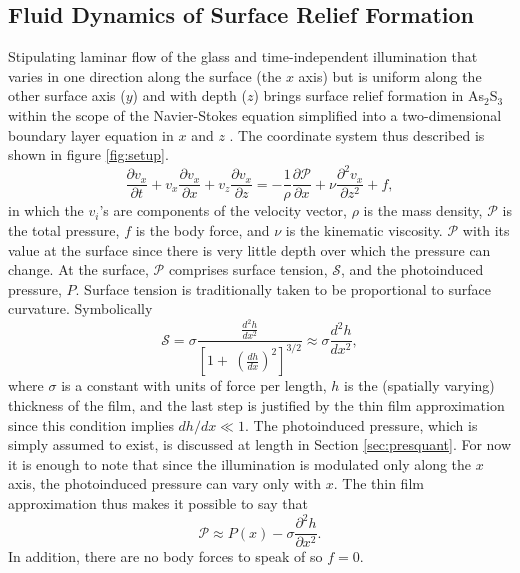 \documentclass[twocolumn,showpacs,preprintnumbers,amsmath,amssymb]{revtex4}
\begin{document}
\subsection{Fluid Dynamics of Surface Relief Formation}
\label{sec:fluids} Stipulating laminar flow of the glass and time-independent
illumination that varies in one direction along the surface (the $x$ axis) but is uniform
along the other surface axis ($y$) and with depth ($z$) brings surface relief formation
in As$_2$S$_3$ within the scope of the Navier-Stokes equation simplified into a
two-dimensional boundary layer equation in $x$ and $z$ \cite{levich}. The coordinate
system thus described is shown in figure \ref{fig:setup}.
\begin{equation}
\frac{\partial v_x}{\partial t}+v_x\frac{\partial v_x}{\partial x} +v_z\frac{\partial
v_x}{\partial z} = - \frac{1}{\rho}\frac{\partial \mathcal{P}}{\partial
x}+\nu\frac{\partial^2 v_x}{\partial z^2}+f \mathrm{,} \label{eq:levstokes}
\end{equation}
in which the $v_i$'s are components of the velocity vector, $\rho$ is the mass density,
$\mathcal{P}$ is the total pressure,  $f$ is the body force, and $\nu$ is the kinematic
viscosity. %
$\mathcal{P}$ with its value at the surface since there is very little depth over which
the pressure can change. At the surface, $\mathcal{P}$ comprises surface tension,
$\mathcal{S}$,  and the photoinduced pressure, $P$. Surface tension is traditionally
taken to be proportional to surface curvature. Symbolically
\begin{equation}
\mathcal{S}= \sigma \frac{\frac{d^2h}{dx^2}}{\left[1+\
\left(\frac{dh}{dx}\right)^2\right]^{3/2}}\approx \sigma \frac{d^2h}{dx^2} \mathrm{,}
\label{eq:surften}
\end{equation}
where $\sigma$ is a constant with units of force per length, $h$ is the (spatially
varying) thickness of the film, and the last step is justified by the thin film
approximation since this condition implies $dh/dx\ll 1$. The photoinduced pressure, which
is simply assumed to exist, is discussed at length in Section \ref{sec:presquant}. For
now it is enough to note that since the illumination is modulated only along the $x$
axis, the photoinduced pressure can vary only with $x$. The thin film approximation thus
makes it possible to say that
\begin{equation}
\mathcal{P} \approx P(x)-\sigma\frac{\partial^2 h}{\partial x^2} \mathrm{.}
\end{equation}
In addition, there are no body forces to speak of so $f=0$.
\end{document}
